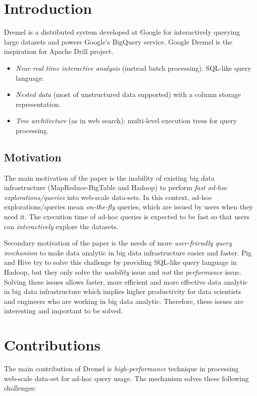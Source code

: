 \documentclass[twocolumn]{article}
\newcommand{\bi}{\begin{itemize}}
\newcommand{\ei}{\end{itemize}}
\newcommand{\ii}{\item}
\begin{document}
\section{Introduction}
Dremel is a distributed system developed at Google for interactively querying large datasets and powers Google's BigQuery service. Google Dremel is the inspiration for Apache Drill project.
\bi
\ii \textit{Near real time interactive analysis} (instead batch processing). SQL-like query language.
\ii \textit{Nested data} (most of unstructured data supported) with a column storage representation.
\ii \textit{Tree architecture} (as in web search): multi-level execution trees for query processing.
\ei

\subsection{Motivation}
The main motivation of the paper is the inability of existing big data infrastructure (MapReduce-BigTable and Hadoop) to perform \textit{fast ad-hoc explorations/queries} into web-scale data-sets. 
In this context, ad-hoc explorations/queries mean \textit{on-the-fly} queries, which are issued by users when they need it. The execution time of ad-hoc queries is expected to be fast so that users can \textit{interactively} explore the datasets.

Secondary motivation of the paper is the needs of more \textit{user-friendly query mechanism} to make data analytic in big data infrastructure easier and faster. 
Pig and Hive try to solve this challenge by providing SQL-like query language in Hadoop, 
but they only solve the \textit{usability} issue and \textit{not} the \textit{performance} issue.
Solving these issues allows faster, more efficient and more effective data analytic in big data infrastructure 
which implies higher productivity for data scientists and engineers who are working in big data analytic. 
Therefore, these issues are interesting and important to be solved.

\section{Contributions}
The main contribution of Dremel is\textit{ high-performance} technique in processing web-scale data-set for 
ad-hoc query usage. The mechanism solves these following challenges:
\end{document}
